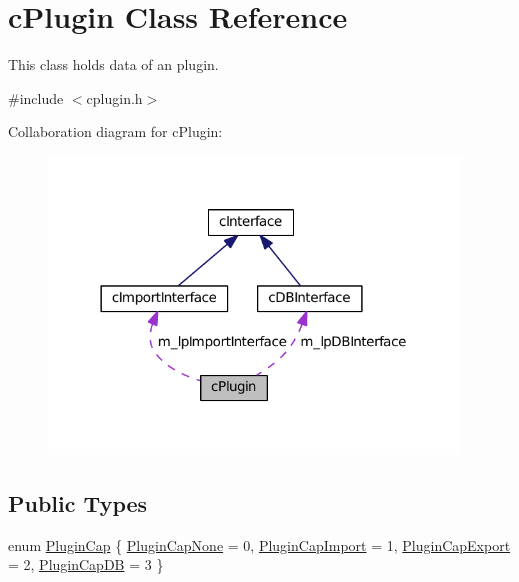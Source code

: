 \hypertarget{classc_plugin}{}\section{c\+Plugin Class Reference}
\label{classc_plugin}


This class holds data of an plugin.  




{\ttfamily \#include $<$cplugin.\+h$>$}



Collaboration diagram for c\+Plugin\+:
\nopagebreak
\begin{figure}[H]
\begin{center}
\leavevmode
\includegraphics[width=310pt]{classc_plugin__coll__graph}
\end{center}
\end{figure}
\subsection*{Public Types}
\begin{DoxyCompactItemize}
\item 
enum \hyperlink{classc_plugin_a4e67238bd5463a402138f35714d03737}{Plugin\+Cap} \{ \hyperlink{classc_plugin_a4e67238bd5463a402138f35714d03737ac3a90e208bb1491d28dcc07ed68e25bf}{Plugin\+Cap\+None} = 0, 
\hyperlink{classc_plugin_a4e67238bd5463a402138f35714d03737a69c06633a9ed9e6067c8b6d5dbbaef3a}{Plugin\+Cap\+Import} = 1, 
\hyperlink{classc_plugin_a4e67238bd5463a402138f35714d03737a3774310151f2d7281e4c2f3aa94cfe53}{Plugin\+Cap\+Export} = 2, 
\hyperlink{classc_plugin_a4e67238bd5463a402138f35714d03737a55cc93f4b4029cbacf03053c54862b29}{Plugin\+Cap\+DB} = 3
 \}
\end{DoxyCompactItemize}
